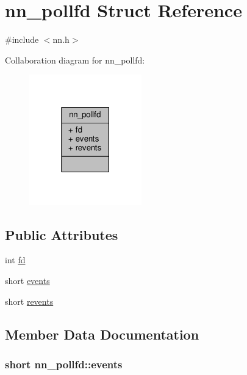 \hypertarget{structnn__pollfd}{}\section{nn\+\_\+pollfd Struct Reference}
\label{structnn__pollfd}


{\ttfamily \#include $<$nn.\+h$>$}



Collaboration diagram for nn\+\_\+pollfd\+:\nopagebreak
\begin{figure}[H]
\begin{center}
\leavevmode
\includegraphics[width=138pt]{structnn__pollfd__coll__graph}
\end{center}
\end{figure}
\subsection*{Public Attributes}
\begin{DoxyCompactItemize}
\item 
int \hyperlink{structnn__pollfd_a6f8872e0d7e690a62592e2ffaa1b912a}{fd}
\item 
short \hyperlink{structnn__pollfd_aa506ca5b96774eb4bd5e2a785e40f00a}{events}
\item 
short \hyperlink{structnn__pollfd_aee92d25ebcaf6dbb0030537a75ddc7a1}{revents}
\end{DoxyCompactItemize}


\subsection{Member Data Documentation}
\subsubsection[{events}]{\setlength{\rightskip}{0pt plus 5cm}short nn\+\_\+pollfd\+::events}\hypertarget{structnn__pollfd_aa506ca5b96774eb4bd5e2a785e40f00a}{}\label{structnn__pollfd_aa506ca5b96774eb4bd5e2a785e40f00a}
